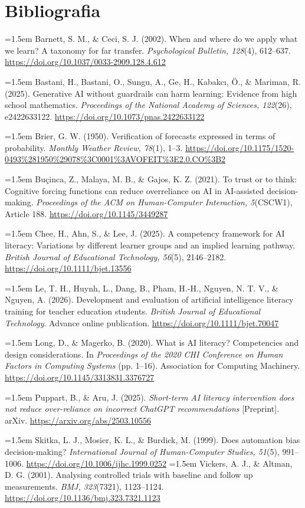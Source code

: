 \documentclass[11pt,a4paper]{article}
\begin{document}
\section*{Bibliografia}
\begingroup
\setlength{\parindent}{0pt}
\setlength{\parskip}{0.5em}
\hangindent=1.5em Barnett, S. M., \& Ceci, S. J. (2002). When and where do we apply what we learn? A taxonomy for far transfer. \textit{Psychological Bulletin, 128}(4), 612--637. \url{https://doi.org/10.1037/0033-2909.128.4.612}

\hangindent=1.5em Bastani, H., Bastani, O., Sungu, A., Ge, H., Kabakc{\i}, Ö., \& Mariman, R. (2025). Generative AI without guardrails can harm learning: Evidence from high school mathematics. \textit{Proceedings of the National Academy of Sciences, 122}(26), e2422633122. \url{https://doi.org/10.1073/pnas.2422633122}

\hangindent=1.5em Brier, G. W. (1950). Verification of forecasts expressed in terms of probability. \textit{Monthly Weather Review, 78}(1), 1--3. \url{https://doi.org/10.1175/1520-0493%281950%29078%3C0001%3AVOFEIT%3E2.0.CO%3B2}

\hangindent=1.5em Buçinca, Z., Malaya, M. B., \& Gajos, K. Z. (2021). To trust or to think: Cognitive forcing functions can reduce overreliance on AI in AI-assisted decision-making. \textit{Proceedings of the ACM on Human-Computer Interaction, 5}(CSCW1), Article 188. \url{https://doi.org/10.1145/3449287}

\hangindent=1.5em Chee, H., Ahn, S., \& Lee, J. (2025). A competency framework for AI literacy: Variations by different learner groups and an implied learning pathway. \textit{British Journal of Educational Technology, 56}(5), 2146--2182. \url{https://doi.org/10.1111/bjet.13556}

\hangindent=1.5em Le, T. H., Huynh, L., Dang, B., Pham, H.-H., Nguyen, N. T. V., \& Nguyen, A. (2026). Development and evaluation of artificial intelligence literacy training for teacher education students. \textit{British Journal of Educational Technology}. Advance online publication. \url{https://doi.org/10.1111/bjet.70047}

\hangindent=1.5em Long, D., \& Magerko, B. (2020). What is AI literacy? Competencies and design considerations. In \textit{Proceedings of the 2020 CHI Conference on Human Factors in Computing Systems} (pp. 1--16). Association for Computing Machinery. \url{https://doi.org/10.1145/3313831.3376727}

\hangindent=1.5em Puppart, B., \& Aru, J. (2025). \textit{Short-term AI literacy intervention does not reduce over-reliance on incorrect ChatGPT recommendations} [Preprint]. arXiv. \url{https://arxiv.org/abs/2503.10556}

\hangindent=1.5em Skitka, L. J., Mosier, K. L., \& Burdick, M. (1999). Does automation bias decision-making? \textit{International Journal of Human-Computer Studies, 51}(5), 991--1006. \url{https://doi.org/10.1006/ijhc.1999.0252}
\hangindent=1.5em Vickers, A. J., \& Altman, D. G. (2001). Analysing controlled trials with baseline and follow up measurements. \textit{BMJ, 323}(7321), 1123--1124. \url{https://doi.org/10.1136/bmj.323.7321.1123}
\endgroup
\end{document}
